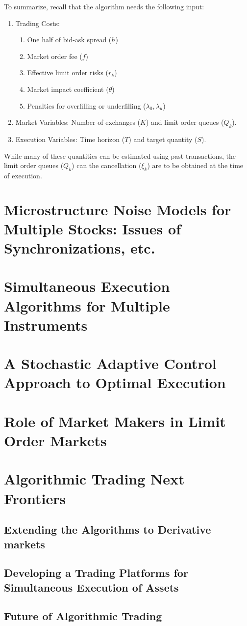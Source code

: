 To summarize, recall that the algorithm needs the following input:
	\begin{enumerate}[--]
	\item Trading Costs: 
		\begin{enumerate}
		\item One half of bid-ask spread ($h$)
		\item Market order fee ($f$)
		\item Effective limit order risks ($r_k$)
		\item Market impact coefficient ($\theta$)
		\item Penalties for overfilling or underfilling ($\lambda_0,\lambda_u$)
		\end{enumerate}
	\item Market Variables: Number of exchanges ($K$) and limit order queues ($Q_k$).
	\item Execution Variables: Time horizon ($T$) and target quantity ($S$).
	\end{enumerate}
While many of these quantities can be estimated using past transactions, the limit order queues ($Q_k$) can the cancellation ($\xi_k$) are to be obtained at the time of execution.


\section{Microstructure Noise Models for Multiple Stocks:  Issues of Synchronizations, etc.}
\section{Simultaneous Execution Algorithms for Multiple Instruments}
\section{A Stochastic Adaptive Control Approach to Optimal Execution}
\section{Role of Market Makers in Limit Order Markets}
\section{Algorithmic Trading Next Frontiers}
\subsection{Extending the Algorithms to Derivative markets}
\subsection{Developing a Trading Platforms for Simultaneous Execution of Assets}
\subsection{Future of Algorithmic Trading}